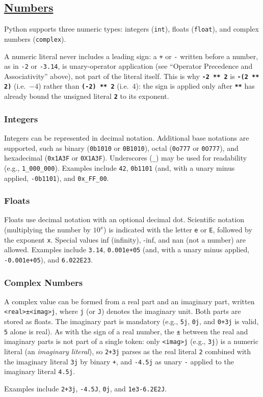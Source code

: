 \subsection*{\href{https://sourceacademy.org/sicpy/1.1.1\#p3}{Numbers}}

Python supports three numeric types: integers (\texttt{int}), floats
(\texttt{float}), and complex numbers (\texttt{complex}).

A numeric literal never includes a leading sign: a \texttt{+} or
\texttt{-} written before a number, as in \texttt{-2} or
\texttt{-3.14}, is unary-operator application (see ``Operator
Precedence and Associativity'' above), not part of the literal itself.
This is why \texttt{\textbf{-2 ** 2}} is \texttt{\textbf{-(2 ** 2)}}
(i.e.\ $-4$) rather than \texttt{\textbf{(-2) ** 2}} (i.e.\ $4$): the
sign is applied only after \texttt{\textbf{**}} has already bound the
unsigned literal \texttt{\textbf{2}} to its exponent.

\subsubsection*{Integers}

Integers can be represented in decimal notation. Additional base
notations are supported, such as binary (\texttt{0b1010} or
\texttt{0B1010}), octal (\texttt{0o777} or \texttt{0O777}), and
hexadecimal (\texttt{0x1A3F} or \texttt{0X1A3F}). Underscores
(\verb|_|) may be used for readability (e.g., \verb|1_000_000|).
Examples include \texttt{42}, \texttt{0b1101} (and, with a unary
minus applied, \texttt{-0b1101}), and \verb|0x_FF_00|.

\subsubsection*{Floats}
Floats use decimal notation with an optional decimal dot. Scientific
notation (multiplying the number by $10^x$) is indicated with the
letter \texttt{e} or \texttt{E}, followed by the exponent \texttt{x}.
Special values inf (infinity), -inf, and nan (not a number) are allowed.
Examples include \texttt{3.14}, \texttt{0.001e+05} (and, with a unary
minus applied, \texttt{-0.001e+05}), and \texttt{6.022E23}.

\subsubsection*{Complex Numbers}
A complex value can be formed from a real part and an imaginary part,
written \texttt{<real>±<imag>j}, where \texttt{j} (or \texttt{J})
denotes the imaginary unit. Both parts are stored as floats. The
imaginary part is mandatory (e.g., \texttt{5j}, \texttt{0j}, and
\texttt{0+3j} is valid, \texttt{5} alone is real).
As with the sign of a real number, the \texttt{±} between the real and
imaginary parts is not part of a single token: only \texttt{<imag>j}
(e.g., \texttt{3j}) is a numeric literal (an \emph{imaginary literal}),
so \texttt{2+3j} parses as the real literal \texttt{2} combined with
the imaginary literal \texttt{3j} by binary \texttt{+}, and
\texttt{-4.5j} as unary \texttt{-} applied to the imaginary literal
\texttt{4.5j}.

Examples include \texttt{2+3j}, \texttt{-4.5J}, \texttt{0j}, and
\texttt{1e3-6.2E2J}.
